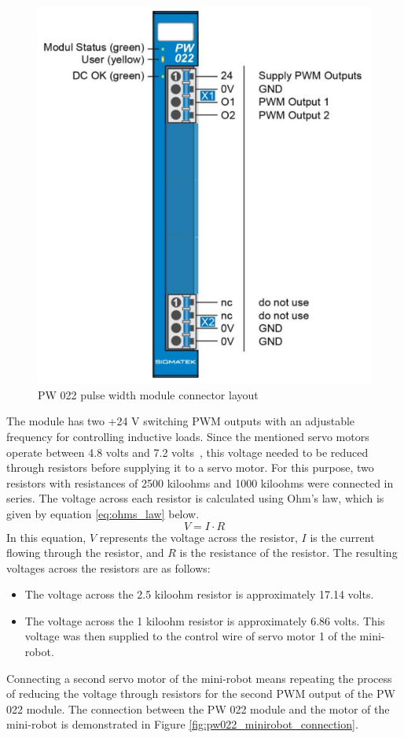 \documentclass[MMR,Master,english]{twbook}
\begin{document}
\begin{figure}[H]
	\centering
	\includegraphics[width=0.5\columnwidth]{img/experiment/pw022_connectors.png}
	\caption[PW 022 pulse width module connector layout]{PW 022 pulse width module connector layout~\cite{DigitalOutputSIGMATEK}}
	\label{fig:pw022_connectors}
\end{figure}

\noindent The module has two +24 V switching PWM outputs with an adjustable frequency for controlling inductive loads. Since the mentioned servo motors operate between 4.8 volts and 7.2 volts~\cite{MG996RServoMotor}, this voltage needed to be reduced through resistors before supplying it to a servo motor. For this purpose, two resistors with resistances of 2500 kiloohms and 1000 kiloohms were connected in series. The voltage across each resistor is calculated using Ohm's law, which is given by equation \ref{eq:ohms_law} below.
\begin{equation}
	\label{eq:ohms_law}
	V = I \cdot R
\end{equation}	
In this equation, \(V\) represents the voltage across the resistor, \(I\) is the current flowing through the resistor, and \(R\) is the resistance of the resistor. The resulting voltages across the resistors are as follows:
\begin{itemize}
\item The voltage across the 2.5 kiloohm resistor is approximately 17.14 volts.
\item The voltage across the 1 kiloohm resistor is approximately 6.86 volts. This voltage was then supplied to the control wire of servo motor 1 of the mini-robot.
\end{itemize}

\noindent Connecting a second servo motor of the mini-robot means repeating the process of reducing the voltage through resistors for the second PWM output of the PW 022 module. The connection between the PW 022 module and the motor of the mini-robot is demonstrated in Figure \ref{fig:pw022_minirobot_connection}.
\end{document}
